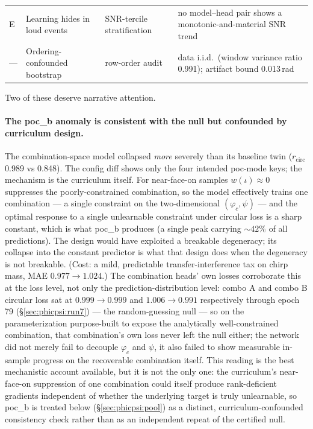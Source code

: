 \begin{table}[tbp]
{\begin{tabular}{@{}llll@{}}
        E   & Learning hides in loud events       & SNR-tercile stratification            & no model--head pair shows a monotonic-and-material SNR trend                                                                                                                                         \\
        --- & Ordering-confounded bootstrap       & row-order audit                       & data i.i.d.\ (window variance ratio 0.991); artifact bound 0.013\,rad                                                                                                                                \\
        \bottomrule
    \end{tabular}
    }
\end{table}

Two of these deserve narrative attention.

\paragraph{The poc\_b anomaly is consistent with the null but confounded by curriculum design.}
The combination-space model collapsed \emph{more} severely than its baseline twin ($r_{\mathrm{circ}}$ 0.989 vs 0.848).
The config diff shows only the four intended poc-mode keys; the mechanism is the curriculum itself.
For near-face-on samples $w(\iota) \approx 0$ suppresses the poorly-constrained combination, so the model effectively trains one combination --- a single constraint on the two-dimensional $(\varphi_c, \psi)$ --- and the optimal response to a single unlearnable constraint under circular loss is a sharp constant, which is what poc\_b produces (a single peak carrying ${\sim}42\%$ of all predictions).
The design would have exploited a breakable degeneracy; its collapse into the constant predictor is what that design does when the degeneracy is not breakable.
(Cost: a mild, predictable transfer-interference tax on chirp mass, MAE $0.977 \to 1.024$.)
The combination heads' own losses corroborate this at the loss level, not only the prediction-distribution level: combo A and combo B circular loss sat at $0.999 \to 0.999$ and $1.006 \to 0.991$ respectively through epoch 79 (\S\ref{sec:phicpsi:run7}) --- the random-guessing null --- so on the parameterization purpose-built to expose the analytically well-constrained combination, that combination's own loss never left the null either; the network did not merely fail to decouple $\varphi_c$ and $\psi$, it also failed to show measurable in-sample progress on the recoverable combination itself.
This reading is the best mechanistic account available, but it is not the only one: the curriculum's near-face-on suppression of one combination could itself produce rank-deficient gradients independent of whether the underlying target is truly unlearnable, so poc\_b is treated below (\S\ref{sec:phicpsi:pool}) as a distinct, curriculum-confounded consistency check rather than as an independent repeat of the certified null.

